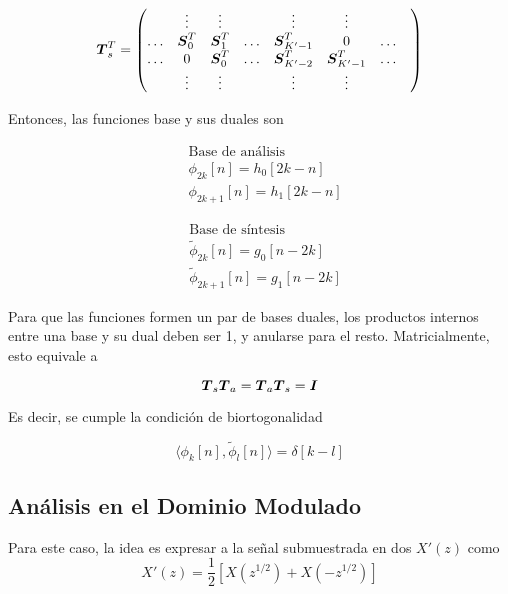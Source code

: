 	\begin{equation}
		\vect{T}^T_s=
		\begin{pmatrix*}[c]
			 & \vdots & \vdots &  & \vdots & \vdots & &\\
			\hdots & \vect{S}^T_0 & \vect{S}^T_1 & \hdots & \vect{S}^T_{K'-1} & 0 & \hdots  \\
			\hdots & 0 & \vect{S}^T_0 & \hdots & \vect{S}^T_{K'-2} & \vect{S}^T_{K'-1} & \hdots  \\
			 & \vdots & \vdots &  & \vdots & \vdots & &\\		
		\end{pmatrix*}
	\end{equation}
		
Entonces, las funciones base y sus duales son

	\begin{align}
		&\text{Base de análisis}	\nonumber \\
		&\phi_{2k}[n]=h_0[2k- n]		\\
		&\phi_{2k+1}[n]=h_1[2k-n]
	\end{align}

	\begin{align}
		&\text{Base de síntesis}	\nonumber \\
		&\tilde{\phi}_{2k}[n]=g_0[n-2k]		\\
		&\tilde{\phi}_{2k+1}[n]=g_1[n-2k]
	\end{align}

Para que las funciones formen un par de bases duales, los productos internos entre una base y su dual deben ser 1, y anularse para el resto. Matricialmente, esto equivale a

	\begin{equation}
		\boldsymbol{T}_s\boldsymbol{T}_a=\boldsymbol{T}_a\boldsymbol{T}_s=\boldsymbol{I}
	\end{equation}

Es decir, se cumple la condición de biortogonalidad

	\begin{equation}
		\langle \phi_k[n], \tilde{\phi}_l[n]\rangle=\delta[k-l]
	\end{equation}


\subsection{Análisis en el Dominio Modulado}

	Para este caso, la idea es expresar a la señal submuestrada en dos $X'(z)$ como
		\begin{equation}
			X'(z)=\frac{1}{2}[X(z^{1/2})+X(-z^{1/2})]
		\end{equation}

